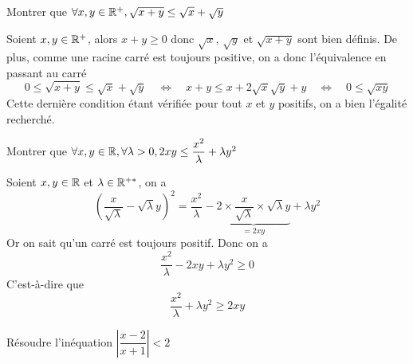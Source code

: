 \documentclass[mathmodern,openany,11pt]{livre}
\begin{document}
\begin{exercice}
Montrer que $\forall x,y\in\mathbb{R}^+,\sqrt{x+y}\le\sqrt{x}+\sqrt{y}$
\end{exercice}

\begin{solution}
Soient $x, y \in \mathbb{R}^+$, alors $x+y \ge 0$ donc $\sqrt{x}$, $\sqrt{y}$ et $\sqrt{x+y}$ sont bien définis. De plus, comme une racine carré est toujours positive, on a donc l'équivalence en passant au carré
\[
0\le\sqrt{x+y}\le\sqrt{x}+\sqrt{y}
\quad\Leftrightarrow\quad
x + y \le x + 2 \sqrt{x}\sqrt{y} + y 
\quad\Leftrightarrow\quad
0 \le \sqrt{xy}
\] 
Cette dernière condition étant vérifiée pour tout $x$ et $y$ positifs, on a bien l'égalité recherché.
\end{solution}

\begin{exercice}
Montrer que $\forall x,y\in\mathbb{R}, \forall\lambda>0, 2xy\le\dfrac{x^2}{\lambda}+\lambda y^2$
\end{exercice}

\begin{solution}
Soient $x, y \in \mathbb{R}$ et $\lambda \in \mathbb{R}^{+*}$, on a \[
\left(\dfrac{x}{\sqrt{\lambda}} - \sqrt{\lambda} y\right)^2 = \dfrac{x^2}{\lambda} - \underbrace{2 \times \dfrac{x}{\sqrt{\lambda}}\times \sqrt{\lambda} y}_{=2xy} +\lambda y^2
\]
Or on sait qu'un carré est toujours positif. Donc on a
\[
\dfrac{x^2}{\lambda} - 2xy +\lambda y^2 \ge 0
\]
C'est-à-dire que
\[
\dfrac{x^2}{\lambda} +\lambda y^2 \ge 2xy
\]
\end{solution}

\begin{exercice}
Résoudre l'inéquation $\left|\dfrac{x-2}{x+1}\right|<2$
\end{exercice}
\end{document}
